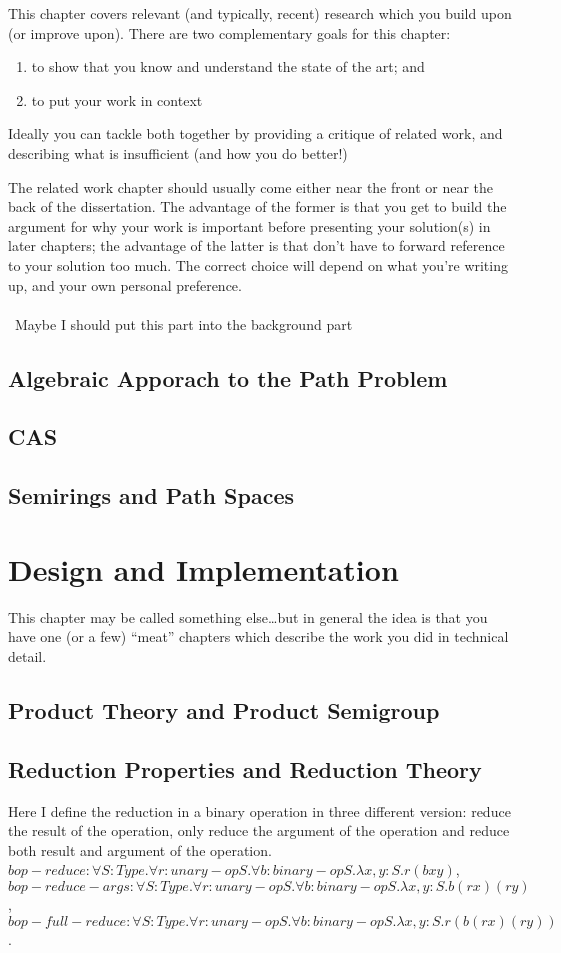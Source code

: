 \documentclass[a4paper,12pt,twoside,openright]{report}
\begin{document}
This chapter covers relevant (and typically, recent) research 
which you build upon (or improve upon). There are two complementary 
goals for this chapter: 
\begin{enumerate} 
  \item to show that you know and understand the state of the art; and 
  \item to put your work in context
\end{enumerate} 

Ideally you can tackle both together by providing a critique of
related work, and describing what is insufficient (and how you do
better!)

The related work chapter should usually come either near the front or
near the back of the dissertation. The advantage of the former is that
you get to build the argument for why your work is important before
presenting your solution(s) in later chapters; the advantage of the
latter is that don't have to forward reference to your solution too
much. The correct choice will depend on what you're writing up, and
your own personal preference.
\\\\\
Maybe I should put this part into the background part
\section{Algebraic Apporach to the Path Problem}
\section{CAS}
\section{Semirings and Path Spaces}


\chapter{Design and Implementation} 

This chapter may be called something else\ldots but in general 
the idea is that you have one (or a few) ``meat'' chapters which
describe the work you did in technical detail. 
\section{Product Theory and Product Semigroup}
\section{Reduction Properties and Reduction Theory}
Here I define the reduction in a binary operation in three different version: reduce the result of the operation, only reduce the argument of the operation and reduce both result and argument of the operation. 
$bop-reduce : \forall S:Type. \forall r: unary-op S. \forall b: binary-op S.\lambda x,y:S. r(b x y)$, 
$bop-reduce-args : \forall S:Type. \forall r: unary-op S. \forall b: binary-op S.\lambda x,y:S. b (r x) (r y)$, 
$bop-full-reduce : \forall S:Type. \forall r: unary-op S. \forall b: binary-op S.\lambda x,y:S. r(b (r x) (r y))$.
\end{document}
